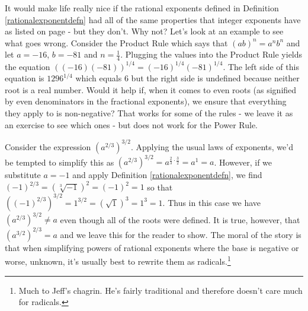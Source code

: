 \documentclass{ximera}
\begin{document}

\medskip

It would make life really nice if the rational exponents defined in Definition \ref{rationalexponentdefn} had all of the same properties that integer exponents have as listed on page \pageref{propertiesofintegerexponents}  - but they don't.  Why not?  Let's look at an example to see what goes wrong.  Consider the Product Rule which says that $(ab)^{n} = a^{n}b^{n}$ and let $a = -16$, $b = -81$ and $n = \frac{1}{4}$.  Plugging the values into the Product Rule yields the equation $((-16)(-81))^{1/4} = (-16)^{1/4}(-81)^{1/4}$.  The left side of this equation is $1296^{1/4}$ which equals $6$ but the right side is undefined because neither root is a real number.  Would it help if, when it comes to even roots (as signified by even denominators in the fractional exponents), we ensure that everything they apply to is non-negative?  That works for some of the rules - we leave it as an exercise to see which ones - but does not work for the Power Rule.

\bigskip
 
Consider the expression $\left(a^{2/3}\right)^{3/2}$.  Applying the usual laws of exponents, we'd be tempted to simplify this as $\left(a^{2/3}\right)^{3/2} = a^{\frac{2}{3} \cdot \frac{3}{2}} = a^{1} = a$.  However, if we substitute $a=-1$ and apply Definition \ref{rationalexponentdefn}, we find $(-1)^{2/3} = \left(\sqrt[3]{-1}\right)^2 = (-1)^2 = 1$ so that $\left((-1)^{2/3}\right)^{3/2} = 1^{3/2} = \left(\sqrt{1}\right)^3 = 1^3 = 1$.  Thus in this case we have $\left(a^{2/3}\right)^{3/2} \neq a$ even though all of the roots were defined.  It is true, however, that $\left(a^{3/2}\right)^{2/3} = a$  and we leave this for the reader to show.  The moral of the story is that when simplifying powers of rational exponents where the base is negative or worse, unknown, it's usually best to rewrite them as radicals.\footnote{Much to Jeff's chagrin.  He's fairly traditional and therefore doesn't care much for radicals.}
\end{document}
